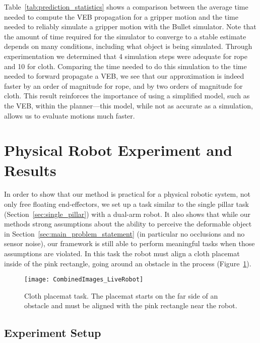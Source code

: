 Table~\ref{tab:prediction_statistics} shows a comparison between the average time needed to compute the VEB propagation for a gripper motion and the time needed to reliably simulate a gripper motion with the Bullet simulator. Note that the amount of time required for the simulator to converge to a stable estimate depends on many conditions, including what object is being simulated. Through experimentation we determined that 4 simulation steps were adequate for rope and 10 for cloth. Comparing the time needed to do this simulation to the time needed to forward propagate a VEB, we see that our approximation is indeed faster by an order of magnitude for rope, and by two orders of magnitude for cloth. This result reinforces the importance of using a simplified model, such as the VEB, within the planner---this model, while not as accurate as a simulation, allows us to evaluate motions much faster.





\section{Physical Robot Experiment and Results}
\label{sec:live_robot}

In order to show that our method is practical for a physical robotic system, not only free floating end-effectors, we set up a task similar to the single pillar task (Section~\ref{sec:single_pillar}) with a dual-arm robot. It also shows that while our methods strong assumptions about the ability to perceive the deformable object in Section~\ref{sec:main_problem_statement} (in particular no occlusions and no sensor noise), our framework is still able to perform meaningful tasks when those assumptions are violated. In this task the robot must align a cloth placemat inside of the pink rectangle, going around an obstacle in the process (Figure~\ref{fig:cloth_placemat}).

\begin{figure}[h]
    \centering
    \texttt{[image: CombinedImages\_LiveRobot]}
    \vspace{-1.7in}
    \caption{Cloth placemat task. The placemat starts on the far side of an obstacle and must be aligned with the pink rectangle near the robot.}
    \label{fig:cloth_placemat}
\end{figure}

\subsection{Experiment Setup}

